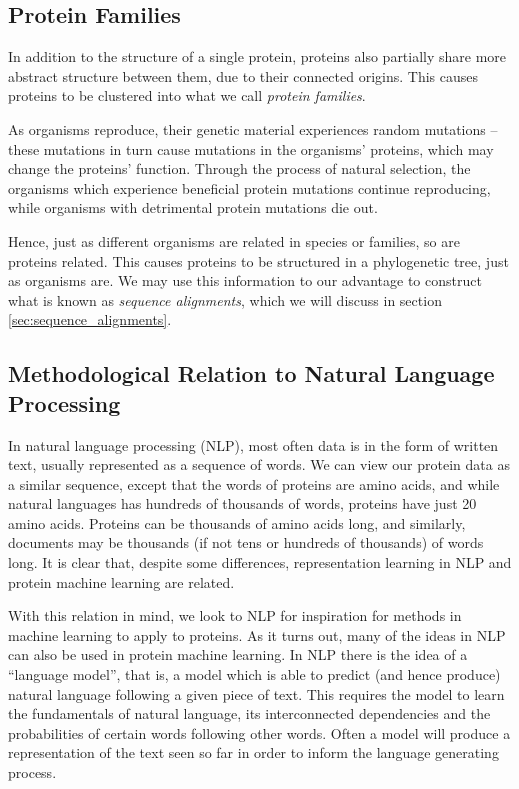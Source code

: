 \subsection{Protein Families}
\label{sec:protein_families}
In addition to the structure of a single protein, proteins also partially share more abstract structure between them, due to their connected origins. This causes proteins to be clustered into what we call \textit{protein families}.

As organisms reproduce, their genetic material experiences random mutations -- these mutations in turn cause mutations in the organisms' proteins, which may change the proteins' function. Through the process of natural selection, the organisms which experience beneficial protein mutations continue reproducing, while organisms with detrimental protein mutations die out.

Hence, just as different organisms are related in species or families, so are proteins related. This causes proteins to be structured in a phylogenetic tree, just as organisms are. We may use this information to our advantage to construct what is known as \textit{sequence alignments}, which we will discuss in section \ref{sec:sequence_alignments}.

\subsection{Methodological Relation to Natural Language Processing}
In natural language processing (NLP), most often data is in the form of written text, usually represented as a sequence of words. We can view our protein data as a similar sequence, except that the words of proteins are amino acids, and while natural languages has hundreds of thousands of words, proteins have just 20 amino acids. Proteins can be thousands of amino acids long, and similarly, documents may be thousands (if not tens or hundreds of thousands) of words long. It is clear that, despite some differences, representation learning in NLP and protein machine learning are related.

With this relation in mind, we look to NLP for inspiration for methods in machine learning to apply to proteins. As it turns out, many of the ideas in NLP can also be used in protein machine learning. In NLP there is the idea of a ``language model'', that is, a model which is able to predict (and hence produce) natural language following a given piece of text. This requires the model to learn the fundamentals of natural language, its interconnected dependencies and the probabilities of certain words following other words. Often a model will produce a representation of the text seen so far in order to inform the language generating process.

